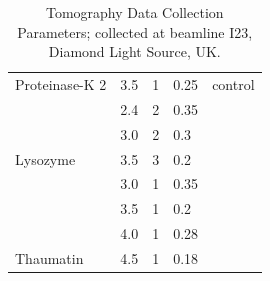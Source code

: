 \begin{table}[h]
{\begin{tabular}{@{}lllll@{}}
\multirow{-2}{*}{Proteinase-K 2} & 3.5    & 1             & 0.25                          & \multirow{-2}{*}{control}      \\
                                 & 2.4    & 2             & 0.35                          &                                \\
                                 & 3.0    & 2             & 0.3                           &                                \\
\multirow{-3}{*}{Lysozyme}       & 3.5    & 3             & 0.2                           &                                \\
                                 & 3.0    & 1             & 0.35                          &                                \\
                                 & 3.5    & 1             & 0.2                           &                                \\
                                 & 4.0    & 1             & 0.28                          &                                \\
\multirow{-4}{*}{Thaumatin}      & 4.5    & 1             & 0.18                          &       \\
\bottomrule
\end{tabular}%
}

\caption{Tomography Data Collection Parameters; collected at beamline I23, Diamond Light Source, UK.}
\label{tomo_table}
\end{table}




\begin{table}[h]
\caption{Experimentally calculated santovac absorption coefficients from AnACor at 50 \% material acceptance. Attenuation length calculated based on chemical formula  and density 1.195 \unit{\gram\per\cubic\cm} on the Center for X-Ray Optics \href{https://henke.lbl.gov/optical_constants/atten2.html}{X-ray Attenuation Length} platform.}
\label{santovac_table}
\end{table}


